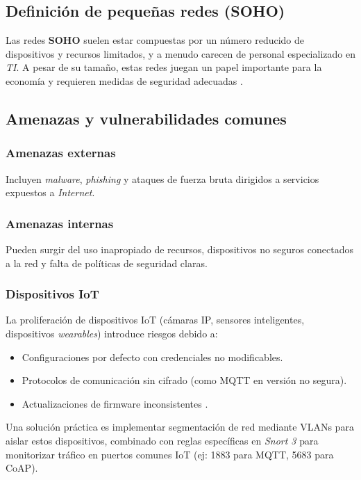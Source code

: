 \documentclass[12pt,a4paper]{report}
\begin{document}
\subsection{Definición de pequeñas redes (SOHO)}

Las redes \textbf{SOHO} suelen estar compuestas por un número reducido de dispositivos y recursos limitados, y a menudo carecen de personal especializado en \textit{TI}. A pesar de su tamaño, estas redes juegan un papel importante para la economía y requieren medidas de seguridad adecuadas \cite{ruedarevisiting}.

\subsection{Amenazas y vulnerabilidades comunes}

\subsubsection{Amenazas externas}

Incluyen \textit{malware}, \textit{phishing} y ataques de fuerza bruta dirigidos a servicios expuestos a \textit{Internet}.

\subsubsection{Amenazas internas}

Pueden surgir del uso inapropiado de recursos, dispositivos no seguros conectados a la red y falta de políticas de seguridad claras.

\subsubsection{Dispositivos IoT}
La proliferación de dispositivos IoT (cámaras IP, sensores inteligentes, dispositivos \textit{wearables}) introduce riesgos debido a:
\begin{itemize}
	\item Configuraciones por defecto con credenciales no modificables.
	\item Protocolos de comunicación sin cifrado (como MQTT en versión no segura).
	\item Actualizaciones de firmware inconsistentes \cite{bakhshi2024review}.
\end{itemize}

Una solución práctica es implementar segmentación de red mediante VLANs para aislar estos dispositivos, combinado con reglas específicas en \textit{Snort 3} para monitorizar tráfico en puertos comunes IoT (ej: 1883 para MQTT, 5683 para CoAP).
\end{document}
